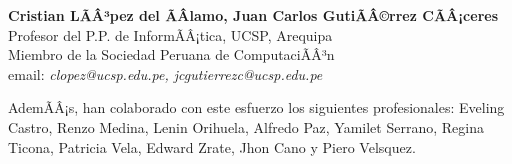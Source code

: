 \begin{center}
\textbf{Cristian LÃÂ³pez del ÃÂlamo, Juan Carlos GutiÃÂ©rrez CÃÂ¡ceres}\\
Profesor del P.P. de InformÃÂ¡tica, UCSP, Arequipa\\
Miembro de la Sociedad Peruana de ComputaciÃÂ³n\\
email: \textit{clopez@ucsp.edu.pe, jcgutierrezc@ucsp.edu.pe}
\end{center}

AdemÃÂ¡s, han colaborado con este esfuerzo los siguientes profesionales: Eveling Castro, Renzo Medina, Lenin Orihuela, Alfredo Paz, Yamilet Serrano, Regina Ticona, Patricia Vela, Edward Z rate, Jhon Cano y Piero Vel squez.

\newpage
